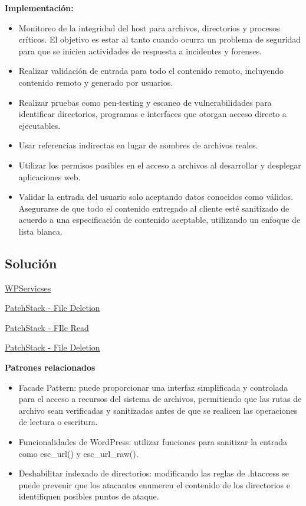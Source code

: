 \textbf{Implementación:}

\begin{itemize}
    \item Monitoreo de la integridad del host para archivos, directorios y procesos críticos. El objetivo es estar al tanto cuando ocurra un problema de seguridad para que se inicien actividades de respuesta a incidentes y forenses.
    \item Realizar validación de entrada para todo el contenido remoto, incluyendo contenido remoto y generado por usuarios.
    \item Realizar pruebas como pen-testing y escaneo de vulnerabilidades para identificar directorios, programas e interfaces que otorgan acceso directo a ejecutables.
    \item Usar referencias indirectas en lugar de nombres de archivos reales.
    \item Utilizar los permisos posibles en el acceso a archivos al desarrollar y desplegar aplicaciones web.
    \item Validar la entrada del usuario solo aceptando datos conocidos como válidos. Asegurarse de que todo el contenido entregado al cliente esté sanitizado de acuerdo a una especificación de contenido aceptable, utilizando un enfoque de lista blanca.
\end{itemize}

\subsection{\textbf{Solución}}

\href{https://www.wpservices.com/stay-secure-protecting-your-wordpress-site-from-directory-traversal-vulnerabilities/}{WPServicses}

\href{https://patchstack.com/academy/wordpress/securing-code/arbitrary-file-deletion/#how-to-secure}{PatchStack - File Deletion}

\href{https://patchstack.com/academy/wordpress/securing-code/arbitrary-file-read/#how-to-secure}{PatchStack - FIle Read}

\href{https://patchstack.com/academy/wordpress/securing-code/arbitrary-file-deletion/}{PatchStack - File Deletion}

\textbf{Patrones relacionados}

\begin{itemize}
    \item Facade Pattern: puede proporcionar una interfaz simplificada y controlada para el acceso a recursos del sistema de archivos, permitiendo que las rutas de archivo sean verificadas y sanitizadas antes de que se realicen las operaciones de lectura o escritura. 
    \item Funcionalidades de WordPress: utilizar funciones para sanitizar la entrada como esc\_url() y esc\_url\_raw().
    \item Deshabilitar indexado de directorios: modificando las reglas de .htaccess se puede prevenir que los atacantes enumeren el contenido de los directorios  e identifiquen posibles puntos de ataque.
\end{itemize}
